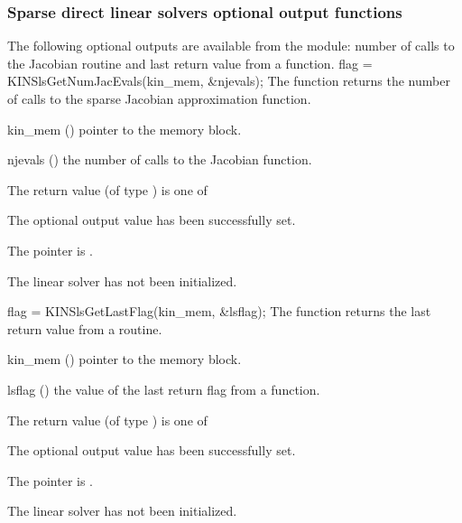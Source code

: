 \subsubsection{Sparse direct linear solvers optional output functions}
\label{sss:optout_sls}
The following optional outputs are available from the {\kinsls} module:
number of calls to the Jacobian routine and last return value from a
{\kinsls} function. 
{
  flag = KINSlsGetNumJacEvals(kin\_mem, \&njevals);
}
{
  The function  returns the
  number of calls to the sparse Jacobian approximation function.
}
{
  \begin{args}
  \item[kin\_mem] ()
    pointer to the {\kinsol} memory block.
  \item[njevals] ()
    the number of calls to the Jacobian function.
  \end{args}
}
{
  The return value  (of type ) is one of
  \begin{args}
  \item[\Id{KINSLS\_SUCCESS}] 
    The optional output value has been successfully set.
  \item[\Id{KINSLS\_MEM\_NULL}]
    The  pointer is .
  \item[\Id{KINSLS\_LMEM\_NULL}]
    The {\kinsls} linear solver has not been initialized.
  \end{args}
}
{}
{
  flag = KINSlsGetLastFlag(kin\_mem, \&lsflag);
}
{
  The function  returns the
  last return value from a {\kinsls} routine. 
}
{
  \begin{args}
  \item[kin\_mem] ()
    pointer to the {\kinsol} memory block.
  \item[lsflag] ()
    the value of the last return flag from a {\kinsls} function.
  \end{args}
}
{
  The return value  (of type ) is one of
  \begin{args}
  \item[\Id{KINSLS\_SUCCESS}] 
    The optional output value has been successfully set.
  \item[\Id{KINSLS\_MEM\_NULL}]
    The  pointer is .
  \item[\Id{KINSLS\_LMEM\_NULL}]
    The {\kinsls} linear solver has not been initialized.
  \end{args}
}
